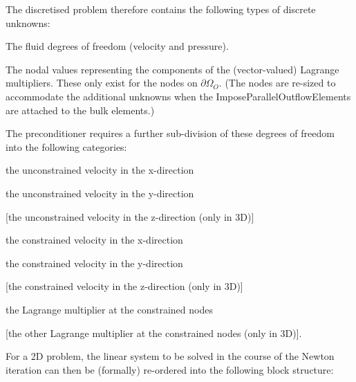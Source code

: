 The discretised problem therefore contains the following types of discrete unknowns\+:
\begin{DoxyItemize}
\item The fluid degrees of freedom (velocity and pressure).~\newline
~\newline

\item The nodal values representing the components of the (vector-\/valued) Lagrange multipliers. These only exist for the nodes on $ \partial \Omega_O$. (The nodes are re-\/sized to accommodate the additional unknowns when the {\ttfamily Impose\+Parallel\+Outflow\+Elements} are attached to the bulk elements.)
\end{DoxyItemize}

The preconditioner requires a further sub-\/division of these degrees of freedom into the following categories\+:
\begin{DoxyItemize}
\item the unconstrained velocity in the x-\/direction
\item the unconstrained velocity in the y-\/direction
\item \mbox{[}the unconstrained velocity in the z-\/direction (only in 3D)\mbox{]}
\item the constrained velocity in the x-\/direction
\item the constrained velocity in the y-\/direction
\item \mbox{[}the constrained velocity in the z-\/direction (only in 3D)\mbox{]}
\item the Lagrange multiplier at the constrained nodes
\item \mbox{[}the other Lagrange multiplier at the constrained nodes (only in 3D)\mbox{]}.
\end{DoxyItemize}For a 2D problem, the linear system to be solved in the course of the Newton iteration can then be (formally) re-\/ordered into the following block structure\+:

